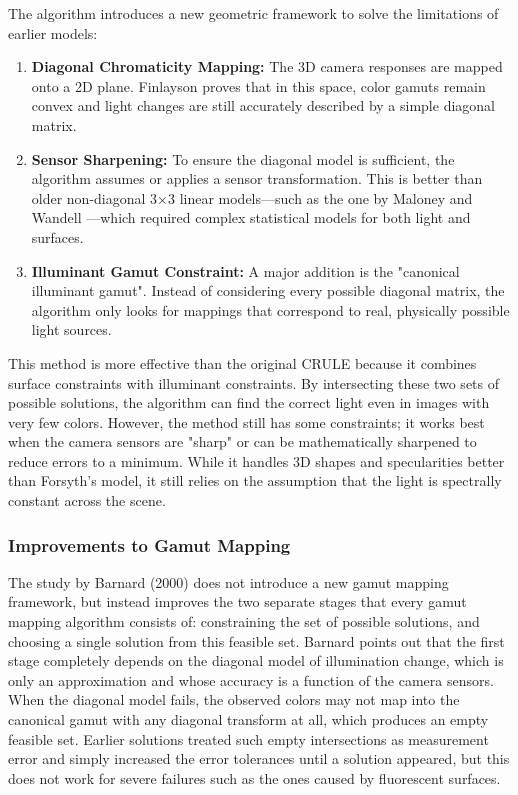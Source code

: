 The algorithm introduces a new geometric framework to solve the limitations of earlier models:
\begin{enumerate}
\item \textbf{Diagonal Chromaticity Mapping:} The 3D camera responses are mapped onto a 2D plane. Finlayson proves that in this space, color gamuts remain convex and light changes are still accurately described by a simple diagonal matrix.
\item \textbf{Sensor Sharpening:} To ensure the diagonal model is sufficient, the algorithm assumes or applies a sensor transformation. This is better than older non-diagonal 3×3 linear models—such as the one by Maloney and Wandell \cite{maloney_wandell_recover_surface_spectral} —which required complex statistical models for both light and surfaces.
\item \textbf{Illuminant Gamut Constraint:} A major addition is the "canonical illuminant gamut". Instead of considering every possible diagonal matrix, the algorithm only looks for mappings that correspond to real, physically possible light sources.
\end{enumerate}  

This method is more effective than the original CRULE because it combines surface constraints with illuminant constraints. By intersecting these two sets of possible solutions, the algorithm can find the correct light even in images with very few colors. However, the method still has some constraints; it works best when the camera sensors are "sharp" or can be mathematically sharpened to reduce errors to a minimum. While it handles 3D shapes and specularities better than Forsyth’s model, it still relies on the assumption that the light is spectrally constant across the scene.

\subsubsection{Improvements to Gamut Mapping}
\label{algorithm:improvements_to_gamut_mapping}

The study by Barnard (2000) \cite{barnardGamutMappingImproved} does not introduce a new gamut mapping framework, but instead improves the two separate stages that every gamut mapping algorithm consists of: constraining the set of possible solutions, and choosing a single solution from this feasible set. Barnard points out that the first stage completely depends on the diagonal model of illumination change, which is only an approximation and whose accuracy is a function of the camera sensors. When the diagonal model fails, the observed colors may not map into the canonical gamut with any diagonal transform at all, which produces an empty feasible set. Earlier solutions treated such empty intersections as measurement error and simply increased the error tolerances until a solution appeared, but this does not work for severe failures such as the ones caused by fluorescent surfaces.

